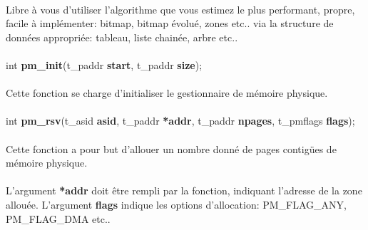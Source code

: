 \documentclass[10pt,a4wide]{article}
\begin{document}
\paragraph{}

Libre \`a vous d'utiliser l'algorithme que vous estimez le plus performant,
propre, facile \`a impl\'ementer: bitmap, bitmap \'evolu\'e, zones etc.. via
la structure de donn\'ees appropri\'ee: tableau, liste chain\'ee, arbre etc..

\paragraph{}

\hspace{1.5cm}int \textbf{pm\_init}(t\_paddr \textbf{start},
                                    t\_paddr \textbf{size});

\paragraph{}

Cette fonction se charge d'initialiser le gestionnaire de m\'emoire physique.

\paragraph{}

\hspace{1.5cm}int \textbf{pm\_rsv}(t\_asid \textbf{asid},
                                   t\_paddr \textbf{*addr},
                                   t\_paddr \textbf{npages},
                                   t\_pmflags \textbf{flags});

\paragraph{}

Cette fonction a pour but d'allouer un nombre donn\'e de pages contig\"ues
de m\'emoire physique.

\paragraph{}

L'argument \textbf{*addr} doit \^etre rempli par la fonction, indiquant
l'adresse de la zone allou\'ee. L'argument \textbf{flags} indique les options
d'allocation: PM\_FLAG\_ANY, PM\_FLAG\_DMA etc..

\paragraph{}
\end{document}
